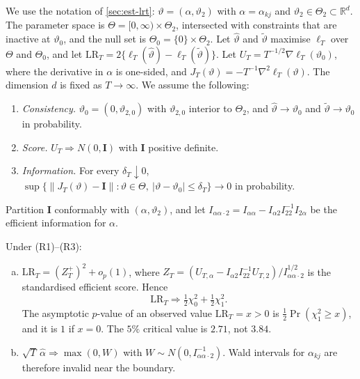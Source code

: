 We use the notation of \cref{sec:est-lrt}: $\vartheta=(\alpha,\vartheta_2)$ with
$\alpha=\alpha_{kj}$ and $\vartheta_2\in\Theta_2\subset\mathbb R^d$. The parameter space is
$\Theta=[0,\infty)\times\Theta_2$, intersected with constraints that are inactive at
$\vartheta_0$, and the null set is $\Theta_0=\{0\}\times\Theta_2$. Let $\hat\vartheta$ and
$\tilde\vartheta$ maximise $\ell_T$ over $\Theta$ and $\Theta_0$, and let
$\mathrm{LR}_T=2\{\ell_T(\hat\vartheta)-\ell_T(\tilde\vartheta)\}$. Let
$U_T=T^{-1/2}\nabla\ell_T(\vartheta_0)$, where the derivative in $\alpha$ is one-sided, and
$J_T(\vartheta)=-T^{-1}\nabla^2\ell_T(\vartheta)$. The dimension $d$ is fixed as
$T\to\infty$. We assume the following:
\begin{enumerate}[({R}1)]
  \item \emph{Consistency.} $\vartheta_0=(0,\vartheta_{2,0})$ with $\vartheta_{2,0}$ interior to $\Theta_2$, and
    $\hat\vartheta\to\vartheta_0$ and $\tilde\vartheta\to\vartheta_0$ in probability.
  \item \emph{Score.} $U_T\Rightarrow N(0,\bm I)$ with $\bm I$ positive definite.
  \item \emph{Information.} For every $\delta_T\downarrow0$,
    $\sup\{\|J_T(\vartheta)-\bm I\|:\vartheta\in\Theta,\ |\vartheta-\vartheta_0|\le\delta_T\}\to0$
    in probability.
\end{enumerate}
Partition $\bm I$ conformably with $(\alpha,\vartheta_2)$, and let
$I_{\alpha\alpha\cdot2}=I_{\alpha\alpha}-I_{\alpha2}I_{22}^{-1}I_{2\alpha}$ be
the efficient information for $\alpha$.

\begin{proposition}\label{prop:lrt}
Under {(R1)}--{(R3)}:
\begin{enumerate}[(a)]
  \item $\mathrm{LR}_T=(Z_T^+)^2+o_p(1)$, where
    $Z_T=(U_{T,\alpha}-I_{\alpha2}I_{22}^{-1}U_{T,2})/I_{\alpha\alpha\cdot2}^{1/2}$
    is the standardised efficient score. Hence
    \[
      \mathrm{LR}_T\Rightarrow\tfrac12\chi^2_0+\tfrac12\chi^2_1 .
    \]
    The asymptotic $p$-value of an observed value $\mathrm{LR}_T=x>0$ is
    $\tfrac12\Pr(\chi^2_1\ge x)$, and it is $1$ if $x=0$. The $5\%$ critical
    value is $2.71$, not $3.84$.
  \item $\sqrt T\,\hat\alpha\Rightarrow\max(0,W)$ with
    $W\sim N(0,I_{\alpha\alpha\cdot2}^{-1})$. Wald intervals for $\alpha_{kj}$ are
    therefore invalid near the boundary.
\end{enumerate}
\end{proposition}

